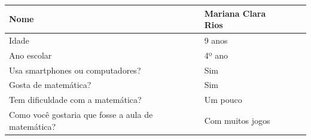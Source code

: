 \documentclass[
    12pt,               %
    openany,          	%
    twoside,            %
    a4paper,            %
    brazil              %
    ]{abntex2}
\begin{document}
\begin{center} \begin{tabular}{ | l | l | l | p{5cm} |}
\hline Nome & Mariana Clara Rios \\\hline
 Idade & 9 anos\\ \hline 
Ano escolar & 4º ano\\ \hline Usa
smartphones ou computadores? & Sim \\ \hline
Gosta de matemática? & Sim \\ \hline
Tem dificuldade com a matemática? & Um pouco \\ \hline
Como você gostaria que fosse a aula de matemática? & Com muitos jogos \\ \hline
\end{tabular} \end{center}
\end{document}
